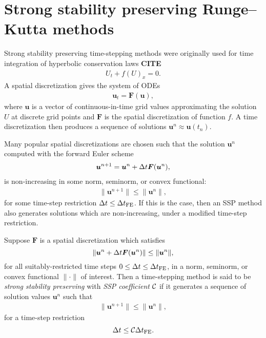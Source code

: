 \section{Strong stability preserving Runge--Kutta methods}
\label{sec:SSP}


Strong stability preserving time-stepping methods were originally used for time integration of hyperbolic conservation laws \textbf{CITE}
\begin{align*}
    U_t + f(U)_x = 0.   %
\end{align*}
A spatial discretization gives the system of ODEs
\begin{align*}
    \bm{u}_{t} = \bm{F}(\bm{u}),
\end{align*}
where $\bm{u}$ is a vector of continuous-in-time grid values approximating the solution $U$ at discrete grid points and $\bm{F}$ is the spatial discretization of function $f$.
A time discretization then produces a sequence of solutions $\bm{u}^{n} \approx \bm{u}(t_n)$.

Many popular spatial discretizations are chosen such that the solution $\bm{u}^{n}$ computed with the forward Euler scheme
\begin{align}\label{eq:forwardEuler}
    \bm{u}^{n+1} = \bm{u}^{n} + \Delta t\bm{F}(\bm{u}^{n}),
\end{align}
is non-increasing in some norm, seminorm, or convex functional:
\begin{align*}
    \|\bm{u}^{n+1}\| \le \|\bm{u}^n\|,
\end{align*}
for some time-step restriction $\Delta t \leq \Delta t_{\text{FE}}$.
If this is the case, then an SSP method also generates solutions which are non-increasing, under a modified time-step restriction.
\begin{definition}
Suppose $\bm{F}$ is a spatial discretization which satisfies
$$\|\bm{u}^{n} + \Delta t\bm{F}(\bm{u}^{n})\| \le \|\bm{u}^n\|,$$
for all suitably-restricted time steps
$0 \le \Delta t \le \Delta t_{\text{FE}}$,
in a norm, seminorm, or convex functional $\|\cdot\|$ of interest.
Then a time-stepping method is said to be \emph{strong stability preserving} with \emph{SSP coefficient} $\mathcal{C}$ if it generates a sequence of solution values $\bm{u}^n$ 
such that
\begin{align*}
  \|\bm{u}^{n+1}\| \le \|\bm{u}^n\|,
\end{align*}
for a time-step restriction
$$\Delta t \leq \mathcal{C} \Delta t_{\text{FE}}.$$
\end{definition}


